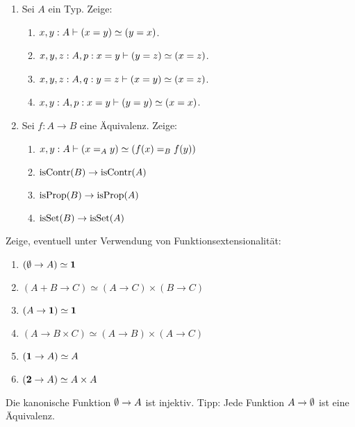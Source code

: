 \documentclass{uebung}
\begin{document}
\begin{exercise}
  \begin{enumerate}
    \item Sei $A$ ein Typ.
      Zeige:
        \begin{enumerate}
          \item $x,y:A \vdash (x=y) \simeq (y=x)$.
          \item $x,y,z:A,p:x=y \vdash (y=z) \simeq (x=z)$.
          \item $x,y,z:A,q:y=z \vdash (x=y) \simeq (x=z)$.
          \item $x,y:A,p:x=y \vdash (y=y) \simeq (x=x)$.
        \end{enumerate}

    \item Sei $f:A\to B$ eine Äquivalenz.
      Zeige:
        \begin{enumerate}
          \item $x,y:A\vdash (x =_A y)\simeq (f(x) =_B f(y))$
          \item $\mathrm{isContr}(B)\to\mathrm{isContr}(A)$
          \item $\mathrm{isProp}(B)\to\mathrm{isProp}(A)$
          \item $\mathrm{isSet}(B)\to\mathrm{isSet}(A)$
        \end{enumerate}
  \end{enumerate}
\end{exercise}

\begin{exercise}
  Zeige, eventuell unter Verwendung von Funktionsextensionalität:
  \begin{multicols}{2}
  \begin{enumerate}
    \item $(\emptyset \to A) \simeq \mathbf{1}$
    \item $(A+B\to C) \simeq (A \to C) \times (B \to C)$
    \item $(A \to \mathbf{1}) \simeq \mathbf{1}$
    \item $(A \to B\times C) \simeq (A \to B) \times (A \to C)$
    \item $(\mathbf{1} \to A)\simeq A$
    \item $(\mathbf{2} \to A)\simeq A\times A$
  \end{enumerate}
  \end{multicols}
\end{exercise}

\begin{bonus}
    Die kanonische Funktion $\emptyset\to A$ ist injektiv.
      {\tiny Tipp: Jede Funktion $A\to\emptyset$ ist eine Äquivalenz.}
\end{bonus}
\end{document}
